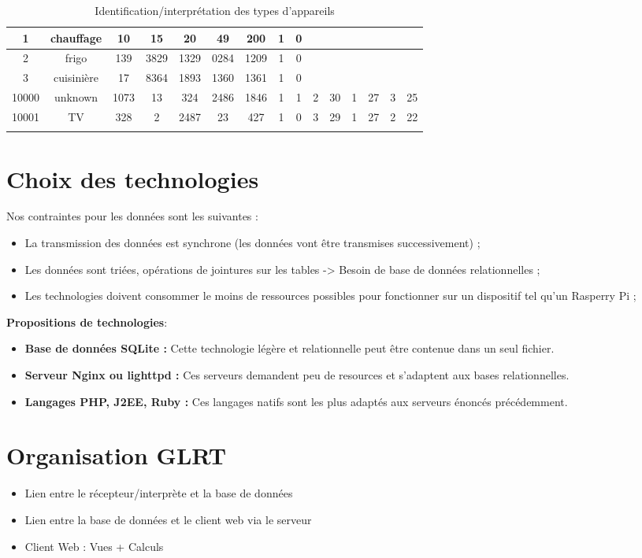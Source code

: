 \documentclass[10pt,a4paper]{article}
\begin{document}
\begin{table}[h]
{\begin{tabular}{|c|c|c|c|c|c|c|c|c|c|c|c|c|c|c|}
1 & chauffage & 10 & 15 & 20 & 49 & 200 & 1 & 0 &  &  &  &  &  &  \\ \hline
2 & frigo & 139 & 3829 & 1329 & 0284 & 1209 & 1 & 0 &  &  &  &  &  &  \\ \hline
3 & cuisinière & 17 & 8364 & 1893 & 1360 & 1361 & 1 & 0  &  &  &  &  &  &  \\ \hline
10000 & unknown & 1073 & 13 & 324 & 2486 & 1846 & 1 & 1 & 2 & 30 & 1 & 27 & 3 & 25 \\ \hline
10001 & TV & 328 & 2 & 2487 & 23 & 427 & 1 & 0 & 3 & 29 & 1 & 27 & 2 & 22 \\ \hline
 &  &  &  &  &  &  &  &  &  &  &  &  &  & 
\end{tabular}
}
\caption{Identification/interprétation des types d'appareils}
\end{table}

\newpage
\section{Choix des technologies}
Nos contraintes pour les données sont les suivantes :
\begin{itemize}
\item La transmission des données est synchrone (les données vont être transmises successivement) ;
\item Les données sont triées, opérations de jointures sur les tables -> Besoin de base de données relationnelles ;
\item Les technologies doivent consommer le moins de ressources possibles pour fonctionner sur un dispositif tel qu'un Rasperry Pi ;
\end{itemize}   
\textbf{Propositions de technologies}:
\begin{itemize}
\item \textbf{Base de données SQLite : }Cette technologie légère et relationnelle peut être contenue dans un seul fichier. 
\item \textbf{Serveur Nginx ou lighttpd : }Ces serveurs demandent peu de resources et s'adaptent aux bases relationnelles.
\item \textbf{Langages PHP, J2EE, Ruby : }Ces langages natifs sont les plus adaptés aux serveurs énoncés précédemment.
\end{itemize}
\section{Organisation GLRT}
\begin{itemize}
\item Lien entre le récepteur/interprète et la base de données
\item Lien entre la base de données et le client web via le serveur
\item Client Web : Vues + Calculs
\end{itemize}
\end{document}
